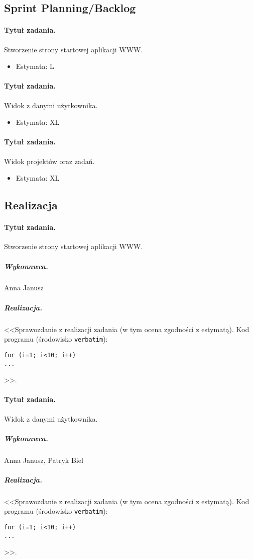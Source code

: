 ﻿\documentclass[a4paper]{article}
\begin{document}
\subsection{Sprint Planning/Backlog}

\paragraph{Tytuł zadania.} Stworzenie strony startowej aplikacji WWW.
\begin{itemize}
\item Estymata: L
\end{itemize}

\paragraph{Tytuł zadania.} Widok z danymi użytkownika.
\begin{itemize}
\item Estymata: XL
\end{itemize}

\paragraph{Tytuł zadania.} Widok projektów oraz zadań.
\begin{itemize}
\item Estymata: XL
\end{itemize}


\subsection{Realizacja}

\paragraph{Tytuł zadania.} Stworzenie strony startowej aplikacji WWW.
\subparagraph{Wykonawca.} Anna Janusz
\subparagraph{Realizacja.} <<Sprawozdanie z realizacji zadania (w tym ocena zgodności z estymatą). Kod programu (środowisko \texttt{verbatim}): \begin{verbatim}
for (i=1; i<10; i++)
...
\end{verbatim}>>.

\paragraph{Tytuł zadania.} Widok z danymi użytkownika.
\subparagraph{Wykonawca.} Anna Janusz, Patryk Biel
\subparagraph{Realizacja.} <<Sprawozdanie z realizacji zadania (w tym ocena zgodności z estymatą). Kod programu (środowisko \texttt{verbatim}): \begin{verbatim}
for (i=1; i<10; i++)
...
\end{verbatim}>>.
\end{document}
